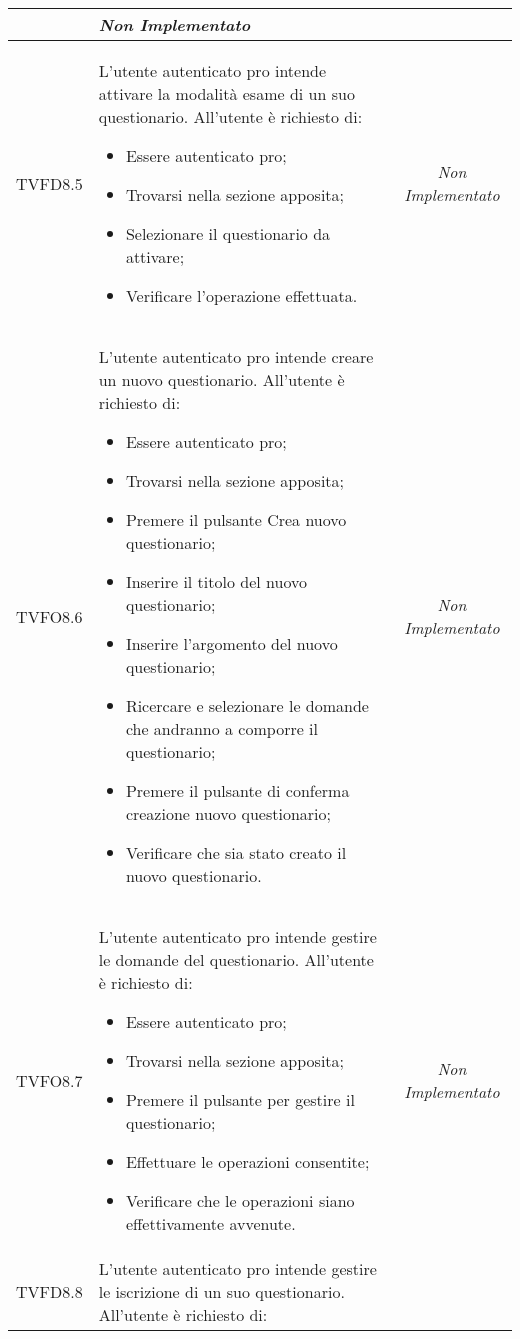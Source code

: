 \begin{longtable}[ht]{|c|>{}m{8cm}|c|}
\begin{itemize}
\end{itemize}
 & \textit{Non Implementato}\\ \hline
\hypertarget{TVFD8.5}{TVFD8.5} & L’utente autenticato pro  intende attivare la modalità esame di un suo questionario. All’utente è richiesto di:
\begin{itemize}
\item Essere autenticato pro;
\item Trovarsi nella sezione apposita;
\item Selezionare il questionario da attivare;
\item Verificare l'operazione effettuata.
\end{itemize} & \textit{Non Implementato}\\ \hline
\hypertarget{TVFO8.6}{TVFO8.6} & L’utente autenticato pro  intende creare  un nuovo questionario. All’utente è richiesto di:
\begin{itemize}
\item Essere autenticato pro;
\item Trovarsi nella sezione apposita;
\item Premere il pulsante Crea nuovo questionario;
\item Inserire il titolo del nuovo questionario;
\item Inserire l’argomento del nuovo questionario;
\item Ricercare e selezionare le domande che andranno a comporre il questionario;
\item Premere il pulsante di conferma creazione nuovo questionario;
\item Verificare che sia stato creato il nuovo questionario.
\end{itemize} & \textit{Non Implementato}\\ \hline
\hypertarget{TVFO8.7}{TVFO8.7} & L’utente autenticato pro  intende gestire le domande del questionario. All’utente è richiesto di:
\begin{itemize}
\item Essere autenticato pro;
\item Trovarsi nella sezione apposita;
\item Premere il pulsante per gestire il questionario;
\item Effettuare le operazioni consentite;
\item Verificare che le operazioni siano effettivamente avvenute.
\end{itemize} & \textit{Non Implementato}\\ \hline
\hypertarget{TVFD8.8}{TVFD8.8} & L’utente autenticato pro  intende gestire le iscrizione di un suo questionario. All’utente è richiesto di:

\end{longtable}
